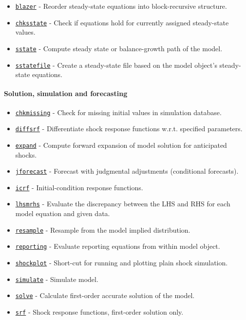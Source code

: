 \begin{itemize}
\itemsep1pt\parskip0pt
\item
  \href{model/blazer}{\texttt{blazer}} - Reorder steady-state equations
  into block-recursive structure.
\item
  \href{model/chksstate}{\texttt{chksstate}} - Check if equations hold
  for currently assigned steady-state values.
\item
  \href{model/sstate}{\texttt{sstate}} - Compute steady state or
  balance-growth path of the model.
\item
  \href{model/sstatefile}{\texttt{sstatefile}} - Create a steady-state
  file based on the model object's steady-state equations.
\end{itemize}

\paragraph{Solution, simulation and
forecasting}

\begin{itemize}
\itemsep1pt\parskip0pt
\item
  \href{model/chkmissing}{\texttt{chkmissing}} - Check for missing
  initial values in simulation database.
\item
  \href{model/diffsrf}{\texttt{diffsrf}} - Differentiate shock response
  functions w.r.t. specified parameters.
\item
  \href{model/expand}{\texttt{expand}} - Compute forward expansion of
  model solution for anticipated shocks.
\item
  \href{model/jforecast}{\texttt{jforecast}} - Forecast with judgmental
  adjustments (conditional forecasts).
\item
  \href{model/icrf}{\texttt{icrf}} - Initial-condition response
  functions.
\item
  \href{model/lhsmrhs}{\texttt{lhsmrhs}} - Evaluate the discrepancy
  between the LHS and RHS for each model equation and given data.
\item
  \href{model/resample}{\texttt{resample}} - Resample from the model
  implied distribution.
\item
  \href{model/reporting}{\texttt{reporting}} - Evaluate reporting
  equations from within model object.
\item
  \href{model/shockplot}{\texttt{shockplot}} - Short-cut for running and
  plotting plain shock simulation.
\item
  \href{model/simulate}{\texttt{simulate}} - Simulate model.
\item
  \href{model/solve}{\texttt{solve}} - Calculate first-order accurate
  solution of the model.
\item
  \href{model/srf}{\texttt{srf}} - Shock response functions, first-order
  solution only.
\end{itemize}

